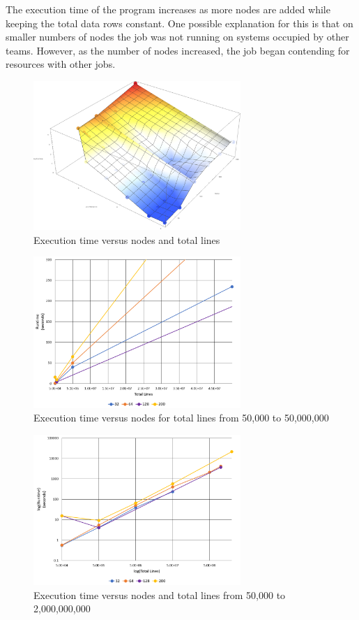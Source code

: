 The execution time of the program increases as more nodes are added while keeping the total data rows constant. One possible explanation for this is that on smaller numbers of nodes the job was not running on systems occupied by other teams. However, as the number of nodes increased, the job began contending for resources with other jobs.

\begin{figure}[h!]
\centering
\includegraphics[width=0.7\textwidth]{./images/runtimes.png}
\caption{Execution time versus nodes and total lines}
\label{fig:plane}
\end{figure}

\begin{figure}[h!]
\centering
\includegraphics[width=0.7\textwidth]{./images/Runtime1.png}
\caption{Execution time versus nodes for total lines from 50,000 to 50,000,000}
\label{fig:lownums}
\end{figure}

\begin{figure}[h!]
\centering
\includegraphics[width=0.7\textwidth]{./images/Runtime2.png}
\caption{Execution time versus nodes and total lines from 50,000 to 2,000,000,000}
\label{fig:allnums}
\end{figure}

